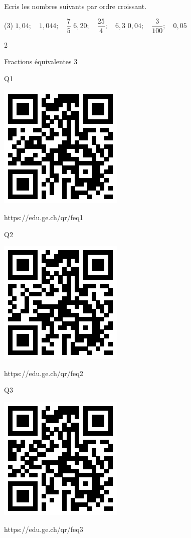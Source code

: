 \documentclass[a4paper,12pt]{report}
\begin{document}

\begin{exo}{
Ecris les nombres suivants par ordre croissant.
	\begin{tasks}(3)
\task $1,04 ;\quad 1,044 ;\quad \dfrac{7}{5}$
\task $6,20 ;\quad \dfrac{25}{4} ;\quad 6,3$
\task $0,04 ;\quad \dfrac{3}{100} ;\quad 0,05$
\end{tasks}
}{2}
\end{exo}




\begin{qmoodle}{Fractions équivalentes
}{3}{
	\begin{center}	
		Q1

\includegraphics[scale=1]{media/qr/feq1}

\tiny{{https://edu.ge.ch/qr/feq1}}
\end{center}
	\begin{center}	
		Q2

\includegraphics[scale=1]{media/qr/feq2}

\tiny{{https://edu.ge.ch/qr/feq2}}
\end{center}
	\begin{center}	
		Q3

\includegraphics[scale=1]{media/qr/feq3}

\tiny{{https://edu.ge.ch/qr/feq3}}
\end{center}
}
\end{qmoodle}
\end{document}
